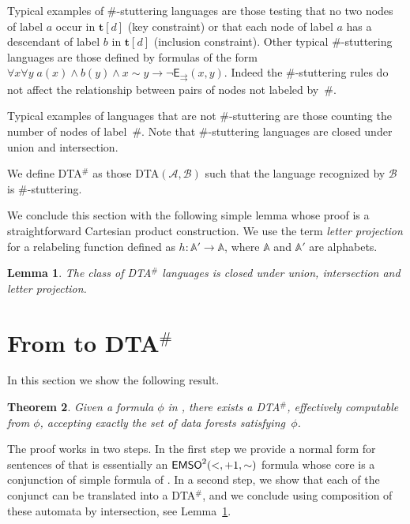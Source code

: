 \documentclass{CSML}
\newtheorem{theorem}{Theorem}
\newtheorem{lemma}[theorem]{Lemma}
\newcommand\dataeq{\ensuremath{\sim}}
\newcommand\neighbor{\ensuremath{\mathord{+}1}}
\newcommand\descendant{\ensuremath{\mathord{<}}}
\newcommand\emsotwo{\ensuremath{\emso^2(\descendant,\neighbor,\mathord{\sim})}\xspace}
\newcommand\dad{\textup{DTA}$^\#$\xspace}
\newcommand\wdad{\textup{DTA}\xspace}
\newcommand\A{\ensuremath{\mathbb{A}}\xspace}
\newcommand\Aa{\mathcal{A}}
\newcommand\Ba{\mathcal{B}}
\newcommand\tree{\boldsymbol{t}}
\newcommand\EE{\mathsf{E}}
\newcommand\SFS{\EE_{\rightrightarrows}}
\begin{document}
\medskip Typical examples of $\#$-stuttering languages are those testing that
no two nodes of label $a$ occur in $\tree[d]$ (key constraint) or that each
node of label $a$ has a descendant of label $b$ in $\tree[d]$ (inclusion
constraint).  Other typical $\#$-stuttering languages are those defined by
formulas of the form $\forall x \forall y\; a(x) \wedge b(y) \wedge x \dataeq y
\to \neg \SFS(x, y)$. Indeed the  $\#$-stuttering rules do not affect the
relationship between pairs of nodes not labeled by~$\#$.

Typical examples of languages that are not $\#$-stuttering are
those counting the number of nodes of label~$\#$.  
Note that $\#$-stuttering
languages are closed under union and intersection. 




\medskip


We define \dad as those \wdad $(\Aa,\Ba)$ such that the language recognized by $\Ba$ is $\#$-stuttering.
\medskip

We conclude this section with the following simple lemma whose proof is a
straightforward Cartesian product construction. We use the term \emph{letter
  projection} for a relabeling function defined as $h : \A' \to \A$, where $\A$
and $\A'$ are alphabets.


\begin{lemma} \label{lem:conjunction-disjunction}
The class of \dad languages is closed 
under union, intersection and letter projection.
\end{lemma}

\section{From \texorpdfstring{\fotwo}{FO2} to \texorpdfstring{\dad}{DTA}}
\label{sec-fotwo-dad}

In this section we show the following result.
\begin{theorem}\label{th-fotwodad}
Given a formula $\phi$ in \fotwo, there exists a \dad,
effectively computable from $\phi$,
accepting exactly the set of data forests satisfying~$\phi$.
\end{theorem}

The proof works in two steps. 
In the first step we provide a normal form for sentences of \fotwo 
that is essentially an \emsotwo formula 
whose core is a conjunction of simple formula of \fotwo. 
In a second step, 
we show that each of the conjunct can be translated into a \dad, 
and we conclude using
composition of these automata by intersection, 
see Lemma~\ref{lem:conjunction-disjunction}.
\end{document}

